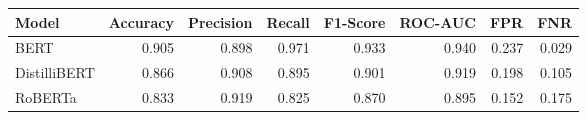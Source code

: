 \begin{tabular}{|l||r|r|r|r|r|r|r|}
\toprule
Model & \textbf{Accuracy} & \textbf{Precision} & Recall & \textbf{F1-Score} & \textbf{ROC-AUC} & \textbf{FPR} & FNR \\
\midrule \midrule
BERT & 0.905 & 0.898 & 0.971 & 0.933 & 0.940 & 0.237 & 0.029 \\
DistilliBERT & 0.866 & 0.908 & 0.895 & 0.901 & 0.919 & 0.198 & 0.105 \\
RoBERTa & 0.833 & 0.919 & 0.825 & 0.870 & 0.895 & 0.152 & 0.175 \\
\bottomrule
\end{tabular}
